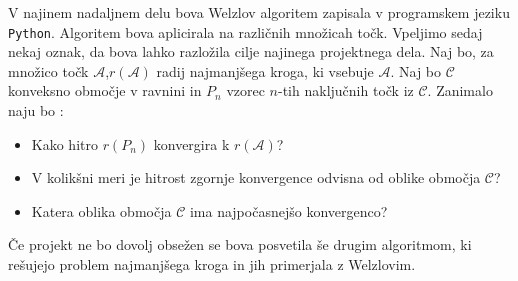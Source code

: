 \documentclass[a4paper]{article}
\begin{document}
V najinem nadaljnem delu bova Welzlov algoritem zapisala v programskem jeziku \texttt{Python}. Algoritem bova aplicirala na različnih množicah točk. Vpeljimo sedaj nekaj oznak, da bova lahko razložila cilje najinega projektnega dela. Naj bo, za množico točk $\mathcal{A}$,$ r(\mathcal{A})$ radij najmanjšega kroga, ki vsebuje $\mathcal{A}$.  Naj bo $\mathcal{C}$ konveksno območje v ravnini in $P_n$ vzorec $n$-tih naključnih točk iz $\mathcal{C}$. Zanimalo naju bo :
\begin{itemize} 
\item Kako hitro $r(P_n)$ konvergira k $r(\mathcal{A})$?
\item V kolikšni meri je hitrost zgornje konvergence odvisna od oblike območja $\mathcal{C}$?
\item Katera oblika območja $\mathcal{C}$ ima najpočasnejšo konvergenco? 
\end{itemize}

Če projekt ne bo dovolj obsežen se bova posvetila še drugim algoritmom, ki rešujejo problem najmanjšega kroga in jih primerjala z Welzlovim.
\end{document}
